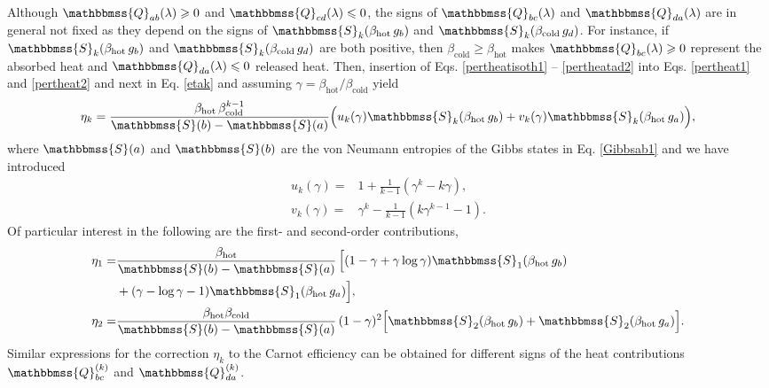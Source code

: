 \documentclass[aps,pra,floatfix,twocolumn,groupedaddress,superscriptaddress,nofootinbib,notitlepage,amsmath,amssymb,]{revtex4-1}
\begin{document}
Although $\mathbbmss{Q}_{ab}(\lambda)\geqslant 0$ and $\mathbbmss{Q}_{cd}(\lambda)\leqslant 0$, the signs of $\mathbbmss{Q}_{bc}(\lambda)$ and $\mathbbmss{Q}_{da}(\lambda)$ are in general not fixed as they depend on the signs of $\mathbbmss{S}_{k}(\beta_{\mathrm{hot}}\, g_b)$ and $\mathbbmss{S}_{k}(\beta_{\mathrm{cold}} \,g_d)$. For instance, if $\mathbbmss{S}_{k}(\beta_{\mathrm{hot}} \, g_b)$ and $\mathbbmss{S}_{k}(\beta_{\mathrm{cold}}\, g_d)$ are both positive, then $\beta_{\mathrm{cold}}\geqslant \beta_{\mathrm{hot}}$ makes $\mathbbmss{Q}_{bc}(\lambda)\geqslant 0$ represent the absorbed heat and $\mathbbmss{Q}_{da}(\lambda)\leqslant 0$ released heat. Then, insertion of Eqs. \eqref{pertheatisoth1} -- \eqref{pertheatad2} into Eqs. \eqref{pertheat1} and \eqref{pertheat2} and next in Eq. \eqref{etak} and assuming $\gamma=\beta_{\mathrm{hot}}/\beta_{\mathrm{cold}}$ yield
\begin{equation}
\eta_{k}=\frac{\beta_{\mathrm{hot}}\,\beta_{\mathrm{cold}}^{k -1}}{\mathbbmss{S}(b)-\mathbbmss{S}(a)}\Big(u_{k}(\gamma)\mathbbmss{S}_{k}(\beta_{\mathrm{hot}}\, g_b) + v_{k}(\gamma) \mathbbmss{S}_{k}(\beta_{\mathrm{hot}}\, g_a)\Big),
\label{effpert}
\end{equation}
where $\mathbbmss{S}(a)$ and $\mathbbmss{S}(b)$ are the von Neumann entropies of the Gibbs states in Eq. \eqref{Gibbsab1} and we have introduced
\begin{align}
\label{ukg}
u_{k}(\gamma)=&1+\frac{1}{k -1}\left(\gamma^{k}-k \gamma\right),\\
\label{vkg}
v_k(\gamma)=&\gamma^{k}-\frac{1}{k -1}\left(k \gamma^{k -1}-1\right).
\end{align}
Of particular interest in the following are the first- and second-order contributions,
\begin{align}
\eta_1=&\frac{\beta_{\mathrm{hot}}}{\mathbbmss{S}(b)-\mathbbmss{S}(a)}\,\Big[(1-\gamma+\gamma\log\gamma) \mathbbmss{S}_1(\beta_{\mathrm{hot}}\,g_b) \nonumber\\
&+(\gamma-\log\gamma-1) \mathbbmss{S}_1(\beta_{\mathrm{hot}}\,g_a)\Big], \label{eta1st} \\
\eta_2=&\frac{\beta_{\mathrm{hot}}\beta_{\mathrm{cold}}}{\mathbbmss{S}(b)-\mathbbmss{S}(a)}\,(1-\gamma)^2\Big[\mathbbmss{S}_2(\beta_{\mathrm{hot}}\, g_b)+ \mathbbmss{S}_2(\beta_{\mathrm{hot}}\,g_a)\Big].
\label{eta2nd}
\end{align}
Similar expressions for the correction $\eta_{k}$ to the Carnot efficiency can be obtained for different signs of the heat contributions $\mathbbmss{Q}^{(k )}_{bc}$ and $\mathbbmss{Q}_{da}^{(k )}$.
\end{document}
